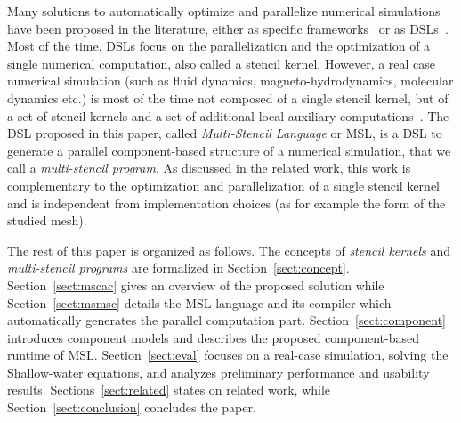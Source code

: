 Many solutions to automatically optimize and parallelize numerical simulations have been proposed in the literature, either as specific frameworks~\cite{CPE:CPE3494,petsc-efficient} or as DSLs~\cite{spaaTangCKLL11,citeulike12258902,Giles2011,DeVito2011LDS}. Most of the time, DSLs focus on the parallelization and the optimization of a single numerical computation, also called a stencil kernel.
However, a real case numerical simulation (such as fluid dynamics, magneto-hydrodynamics, molecular dynamics etc.) is most of the time not composed of a single stencil kernel, but of a set of stencil kernels and a set of additional local auxiliary computations~\cite{Ragan-Kelley:2013:HLC:2491956.2462176}. The DSL proposed in this paper, called \emph{Multi-Stencil Language} or MSL, is a DSL to generate a parallel component-based structure of a numerical simulation, that we call a \emph{multi-stencil program}. As discussed in the related work, this work is complementary to the optimization and parallelization of a single stencil kernel and is independent from implementation choices (as for example the form of the studied mesh).

The rest of this paper is organized as follows. The concepts of \emph{stencil kernels} and \emph{multi-stencil programs} are formalized in Section~\ref{sect:concept}. Section~\ref{sect:mscac} gives an overview of the proposed solution while Section~\ref{sect:msmsc} details the MSL language and its compiler which automatically generates the parallel computation part. Section~\ref{sect:component} introduces component models and describes the proposed component-based runtime of MSL.
Section~\ref{sect:eval} focuses on a real-case simulation, solving the Shallow-water equations, and analyzes preliminary performance and usability results. Sections~\ref{sect:related} states on related work, while Section~\ref{sect:conclusion} concludes the paper.
